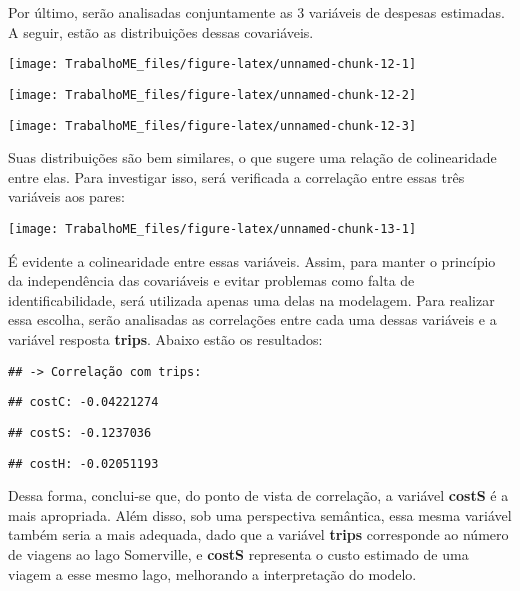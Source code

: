 \documentclass[
  twocolumn]{article}
\begin{document}
Por último, serão analisadas conjuntamente as 3 variáveis de despesas
estimadas. A seguir, estão as distribuições dessas covariáveis.

\begin{center}\texttt{[image: TrabalhoME\_files/figure-latex/unnamed-chunk-12-1]} \end{center}

\begin{center}\texttt{[image: TrabalhoME\_files/figure-latex/unnamed-chunk-12-2]} \end{center}

\begin{center}\texttt{[image: TrabalhoME\_files/figure-latex/unnamed-chunk-12-3]} \end{center}

Suas distribuições são bem similares, o que sugere uma relação de
colinearidade entre elas. Para investigar isso, será verificada a
correlação entre essas três variáveis aos pares:

\begin{center}\texttt{[image: TrabalhoME\_files/figure-latex/unnamed-chunk-13-1]} \end{center}

É evidente a colinearidade entre essas variáveis. Assim, para manter o
princípio da independência das covariáveis e evitar problemas como falta
de identificabilidade, será utilizada apenas uma delas na modelagem.
Para realizar essa escolha, serão analisadas as correlações entre cada
uma dessas variáveis e a variável resposta \textbf{trips}. Abaixo estão
os resultados:

\begin{verbatim}
## -> Correlação com trips:
\end{verbatim}

\begin{verbatim}
## costC: -0.04221274
\end{verbatim}

\begin{verbatim}
## costS: -0.1237036
\end{verbatim}

\begin{verbatim}
## costH: -0.02051193
\end{verbatim}

Dessa forma, conclui-se que, do ponto de vista de correlação, a variável
\textbf{costS} é a mais apropriada. Além disso, sob uma perspectiva
semântica, essa mesma variável também seria a mais adequada, dado que a
variável \textbf{trips} corresponde ao número de viagens ao lago
Somerville, e \textbf{costS} representa o custo estimado de uma viagem a
esse mesmo lago, melhorando a interpretação do modelo.
\end{document}
